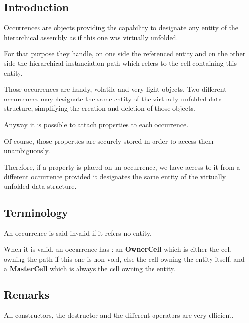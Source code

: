 \hypertarget{classHurricane_1_1Occurrence_secOccurrenceIntro}{}\subsection{Introduction}\label{classHurricane_1_1Occurrence_secOccurrenceIntro}
Occurrences are objects providing the capability to designate any entity of the hierarchical assembly as if this one was virtually unfolded.

For that purpose they handle, on one side the referenced entity and on the other side the hierarchical instanciation path which refers to the cell containing this entity.

Those occurrences are handy, volatile and very light objects. Two different occurrences may designate the same entity of the virtually unfolded data structure, simplifying the creation and deletion of those objects.

Anyway it is possible to attach properties to each occurrence.

Of course, those properties are securely stored in order to access them unambiguously.

Therefore, if a property is placed on an occurrence, we have access to it from a different occurrence provided it designates the same entity of the virtually unfolded data structure.\hypertarget{classHurricane_1_1Occurrence_secOccurrenceTerminology}{}\subsection{Terminology}\label{classHurricane_1_1Occurrence_secOccurrenceTerminology}
An occurrence is said invalid if it refers no entity.

When it is valid, an occurrence has \-: an {\bfseries Owner\-Cell} which is either the cell owning the path if this one is non void, else the cell owning the entity itself. and a {\bfseries Master\-Cell} which is always the cell owning the entity.\hypertarget{classHurricane_1_1Occurrence_secOccurrenceRemarks}{}\subsection{Remarks}\label{classHurricane_1_1Occurrence_secOccurrenceRemarks}
All constructors, the destructor and the different operators are very efficient. 

